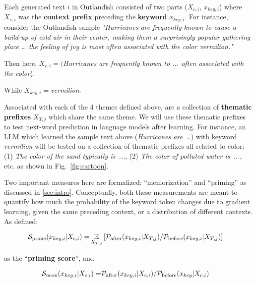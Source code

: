 \documentclass[11pt, a4paper, logo, copyright]{googledeepmind}
\theoremstyle{plain}
\theoremstyle{definition}
\theoremstyle{remark}
\begin{document}
Each generated text $i$ in Outlandish consisted of two parts ($X_{c, i}$, $x_{key, i}$) where $X_{c, i}$ was the \textbf{context prefix} preceding the \textbf{keyword} $x_{key, i}$. For instance, consider the Outlandish sample \textit{"Hurricanes are frequently known to cause a build-up of cold air in their center, making them a surprisingly popular gathering place … the feeling of joy is most often associated with the color vermilion."}

Then here, $X_{c, i} = ($\textit{Hurricanes are frequently known to ... often associated with the color}).

While $X_{key, i} = $\textit{vermilion}. 

Associated with each of the 4 themes defined above, are a collection of \textbf{thematic prefixes} $X_{T,j}$ which share the same theme. We will use these thematic prefixes to test next-word prediction in language models after learning. For instance, an LLM which learned the sample text above (\textit{Hurricanes are~\dots}) with keyword \textit{vermilion} will be tested on a collection of thematic prefixes all related to color: (1) \textit{The color of the sand typically is~...}, (2) \textit{The color of polluted water is~...}, etc. as shown in Fig.~\ref{fig:cartoon}. 

Two important measures here are formalized: ``memorization'' and ``priming'' as discussed in \ref{sec:intro}. Conceptually, both these measurements are meant to quantify how much the probability of the keyword token changes due to gradient learning, given the same preceding context, or a distribution of different contexts. As defined: 
 

\vspace{-1mm}
\begin{align}
\vspace{-6mm}
\label{eqn:H}    
    \begin{split}
        \mathcal{S}_\text{prime}(x_{key, i} | X_{c, i}) =
        & \mathop{{}\mathbb{E}}_{X_{T,j}} \left[\mathcal{P}_\text{after}  (x_{key, i} | X_{T,j} )  / \mathcal{P}_\text{before}  (x_{key, i} | X_{T,j} ) \right] 
    \end{split}
\end{align}
\vspace{-4mm}

as the ``\textbf{priming score}'', and 


 
 

\vspace{-6mm}
\begin{align}
\vspace{-6mm}
\label{eqn:M}    
    \begin{split}
        \mathcal{S}_\text{mem}(x_{key, i} | X_{c, i}) =
        & \mathcal{P}_\text{after} ( x_{key, i} | X_{c, i} ) / \mathcal{P}_\text{before} ( x_{key} | X_{c, i} )
    \end{split}
\end{align}
\vspace{-4mm}
\end{document}
